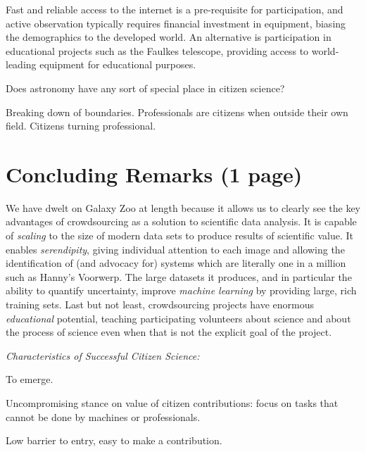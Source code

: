 \documentclass{ar2e}
\begin{document}
Fast and reliable access  to the internet is
a pre-requisite for participation, and active  observation typically requires
financial investment in equipment,  biasing the demographics to the developed
world.  An alternative is  participation in educational projects such as the
Faulkes telescope,  providing access to world-leading equipment for
educational purposes.

Does astronomy have any sort of special place in citizen science?

Breaking down of boundaries. Professionals are citizens when outside their own
field. Citizens turning professional.


\section{Concluding Remarks (1 page)}
\label{sec:conclusions}


We have dwelt on Galaxy Zoo at length because it allows us to clearly see the
key advantages of crowdsourcing as a solution to scientific data analysis. It
is capable of \emph{scaling} to the size of modern data sets to produce
results of scientific value. It enables \emph{serendipity}, giving individual
attention to each image and allowing the identification of (and advocacy for)
systems which are literally one in a million such as Hanny's Voorwerp. The
large datasets it produces, and in particular the ability to quantify
uncertainty, improve \emph{machine learning} by providing large, rich training
sets. Last but not least, crowdsourcing projects have enormous
\emph{educational} potential, teaching participating volunteers about science
and about the process of science even when that is not the explicit goal of
the project. 


{\it Characteristics of Successful Citizen Science:}


To emerge.

Uncompromising stance on value of citizen contributions: focus on tasks that
cannot be done by machines or professionals.

Low barrier to entry, easy to make a contribution.
\end{document}
